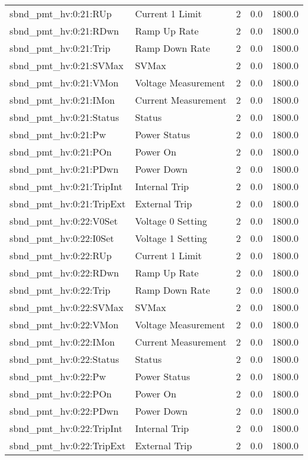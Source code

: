 \begin{center}
\begin{longtable}{l | l l l l }
sbnd\_pmt\_hv:0:21:RUp & Current 1 Limit & 2 & 0.0 & 1800.0\\ 
sbnd\_pmt\_hv:0:21:RDwn & Ramp Up Rate & 2 & 0.0 & 1800.0\\ 
sbnd\_pmt\_hv:0:21:Trip & Ramp Down Rate & 2 & 0.0 & 1800.0\\ 
sbnd\_pmt\_hv:0:21:SVMax & SVMax & 2 & 0.0 & 1800.0\\ 
sbnd\_pmt\_hv:0:21:VMon & Voltage Measurement & 2 & 0.0 & 1800.0\\ 
sbnd\_pmt\_hv:0:21:IMon & Current Measurement & 2 & 0.0 & 1800.0\\ 
sbnd\_pmt\_hv:0:21:Status & Status & 2 & 0.0 & 1800.0\\ 
sbnd\_pmt\_hv:0:21:Pw & Power Status & 2 & 0.0 & 1800.0\\ 
sbnd\_pmt\_hv:0:21:POn & Power On & 2 & 0.0 & 1800.0\\ 
sbnd\_pmt\_hv:0:21:PDwn & Power Down & 2 & 0.0 & 1800.0\\ 
sbnd\_pmt\_hv:0:21:TripInt & Internal Trip & 2 & 0.0 & 1800.0\\ 
sbnd\_pmt\_hv:0:21:TripExt & External Trip & 2 & 0.0 & 1800.0\\ 
sbnd\_pmt\_hv:0:22:V0Set & Voltage 0 Setting & 2 & 0.0 & 1800.0\\ 
sbnd\_pmt\_hv:0:22:I0Set & Voltage 1 Setting & 2 & 0.0 & 1800.0\\ 
sbnd\_pmt\_hv:0:22:RUp & Current 1 Limit & 2 & 0.0 & 1800.0\\ 
sbnd\_pmt\_hv:0:22:RDwn & Ramp Up Rate & 2 & 0.0 & 1800.0\\ 
sbnd\_pmt\_hv:0:22:Trip & Ramp Down Rate & 2 & 0.0 & 1800.0\\ 
sbnd\_pmt\_hv:0:22:SVMax & SVMax & 2 & 0.0 & 1800.0\\ 
sbnd\_pmt\_hv:0:22:VMon & Voltage Measurement & 2 & 0.0 & 1800.0\\ 
sbnd\_pmt\_hv:0:22:IMon & Current Measurement & 2 & 0.0 & 1800.0\\ 
sbnd\_pmt\_hv:0:22:Status & Status & 2 & 0.0 & 1800.0\\ 
sbnd\_pmt\_hv:0:22:Pw & Power Status & 2 & 0.0 & 1800.0\\ 
sbnd\_pmt\_hv:0:22:POn & Power On & 2 & 0.0 & 1800.0\\ 
sbnd\_pmt\_hv:0:22:PDwn & Power Down & 2 & 0.0 & 1800.0\\ 
sbnd\_pmt\_hv:0:22:TripInt & Internal Trip & 2 & 0.0 & 1800.0\\ 
sbnd\_pmt\_hv:0:22:TripExt & External Trip & 2 & 0.0 & 1800.0\\ 

\end{longtable}
\end{center}
